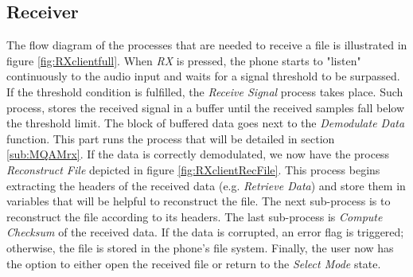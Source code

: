 \documentclass[12pt,a4paper,openright]{report}
\begin{document}
\subsection{Receiver}
The flow diagram of the processes that are needed to receive a file is illustrated in figure \ref{fig:RXclientfull}. When \emph{RX} is pressed, the phone starts to "listen" continuously to the audio input and waits for a signal threshold to be surpassed. If the threshold condition is fulfilled, the \emph{Receive Signal} process takes place. Such process, stores the received signal in a buffer until the received samples fall below the threshold limit. The block of buffered data goes next to the \emph{Demodulate Data} function. This part runs the process that will be detailed in section \ref{sub:MQAMrx}. If the data is correctly demodulated, we now have the process \emph{Reconstruct File} depicted in figure \ref{fig:RXclientRecFile}. This process begins extracting the headers of the received data (e.g. \emph{Retrieve Data}) and store them in variables that will be helpful to reconstruct the file. The next sub-process is to reconstruct the file according to its headers. The last sub-process is \emph{Compute Checksum} of the received data. If the data is corrupted, an error flag is triggered; otherwise, the file is stored in the phone's file system. Finally, the user now has the option to either open the received file or return to the \emph{Select Mode} state.
\end{document}
